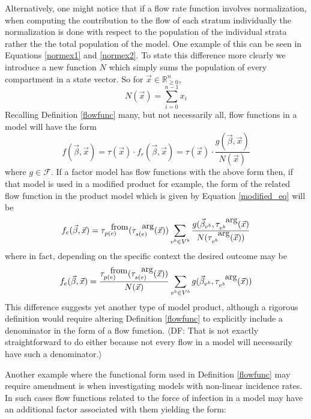 \documentclass[pdflatex,sn-basic]{sn-jnl}%
\theoremstyle{definition}
\newcommand{\dfhide}[1]{{\color{lightgray}$\langle$DF: #1$\rangle$}}
\newcommand{\Rnn}{\mathbb{R}_{\ge 0}}%
\newcommand{\betavec}{\vec{\beta}}
\newcommand{\xvec}{\vec{x}}
\newcommand{\fr}{\ensuremath{\mathcal F}}
\newcommand{\tauf}{\tau^{\mbox{\tiny from}}}
\newcommand{\taua}{\tau^{\mbox{\tiny arg}}}
\begin{document}
Alternatively, one might notice that if a flow rate function involves normalization, when computing the contribution to the flow of each stratum individually the normalization is done with respect to the population of the individual strata rather the the total population of the model. One example of this can be seen in Equations \ref{normex1} and \ref{normex2}. To state this difference more clearly we introduce a new function $N$ which simply sums the population of every compartment in a state vector. So for $\xvec\in \Rnn^n$,
\begin{equation}
    N(\xvec) = \sum\limits_{i=0}^{n-1}x_i
\end{equation}
Recalling Definition \ref{flowfunc} many, but not necessarily all, flow functions in a model will have the form
\begin{equation}
    f(\betavec, \xvec) = \tau(\xvec)\cdot f_r(\betavec, \xvec) = \tau(\xvec) \cdot \frac{g(\betavec, \xvec)}{N(\xvec)}
\end{equation}
where $g\in\fr$. If a factor model has flow functions with the above form then, if that model is used in a modified product for example, the form of the related flow function in the product model which is given by Equation \ref{modified_eq} will be
\begin{equation}
        f_e(\vec{\beta}, \vec{x}) = \tauf_{p(e)}(\taua_{s(e)}(\xvec))\sum\limits_{v^b\in V^b} \frac{g(\betavec_{v^b}, \taua_{v^b}(\xvec)}{N(\taua_{v^b}(\xvec))}
\end{equation}
    where in fact, depending on the specific context the desired outcome may be
\begin{equation}
        f_e(\vec{\beta}, \vec{x}) = \frac{\tauf_{p(e)}(\taua_{s(e)}(\xvec))}{N(\xvec)}\sum\limits_{v^b\in V^b} g(\betavec_{v^b},\taua_{v^b}(\xvec))
\end{equation}
This difference suggests yet another type of model product, although a rigorous definition would require altering Definition \ref{flowfunc} to explicitly include a denominator in the form of a flow function. 
\dfhide{That is not exactly straightforward to do either because not every flow in a model will necessarily have such a denominator.}

Another example where the functional form used in Definition \ref{flowfunc} may require amendment is when investigating models with non-linear incidence rates. In such cases flow functions related to the force of infection in a model may have an additional factor associated with them yielding the form:
\end{document}

